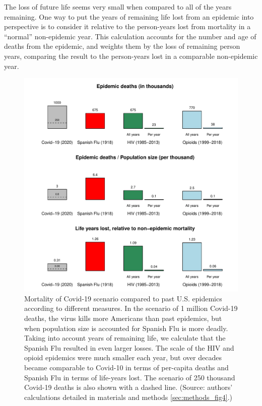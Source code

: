 \documentclass[9pt,twocolumn,twoside,lineno]{pnas-new}
\begin{document}
The loss of future life seems very small when compared to all of the
years remaining. One way to put the years of remaining life lost from
an epidemic into perspective is to consider it relative to the
person-years lost from mortality in a ``normal'' non-epidemic
year. This calculation accounts for the number and age of deaths from
the epidemic, and weights them by the loss of remaining person years,
comparing the result to the person-years lost in a comparable
non-epidemic year.

\begin{figure}%
\centering
\includegraphics[width=.8\linewidth]{fig4_hiv_plus_new_dash}
\caption{Mortality of Covid-19 scenario compared to past
  U.S. epidemics according to different measures. In the scenario of 1
  million Covid-19 deaths, the virus kills more Americans than past
  epidemics, but when population size is accounted for Spanish Flu is
  more deadly. Taking into account years of remaining life, we
  calculate that the Spanish Flu resulted in even larger losses. The
  scale of the HIV and opioid epidemics were much smaller each year,
  but over decades became comparable to Covid-10 in terms of
  per-capita deaths and Spanish Flu in terms of life-years lost. The
  scenario of 250 thousand Covid-19 deaths is also shown with a dashed
  line.  (Source: authors’ calculations detailed in materials and
  methods \ref{sec:methods_fig4}.)}

\label{fig:epidemics}
\end{figure}
\end{document}
